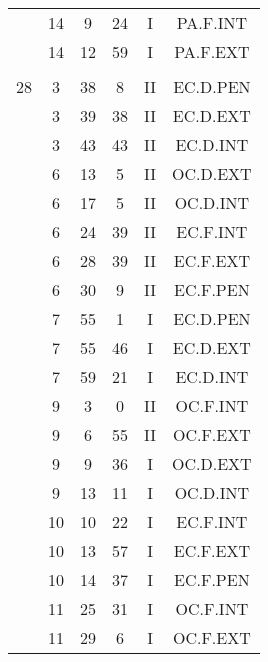 \documentclass[12pt, a4paper]{article}
\begin{document}
\begin{multicols}{3}
{\begin{tabular}{c c c c c c}
	 	 	 	 & 14 & 9 & 24 & I & PA.F.INT\\%
	 	 	 	 & 14 & 12 & 59 & I & PA.F.EXT\\%
	 	 	 	 & & & & & \\%
	 	 	 	28 & 3 & 38 & 8 & II & EC.D.PEN\\%
	 	 	 	 & 3 & 39 & 38 & II & EC.D.EXT\\%
	 	 	 	 & 3 & 43 & 43 & II & EC.D.INT\\%
	 	 	 	 & 6 & 13 & 5 & II & OC.D.EXT\\%
	 	 	 	 & 6 & 17 & 5 & II & OC.D.INT\\%
	 	 	 	 & 6 & 24 & 39 & II & EC.F.INT\\%
	 	 	 	 & 6 & 28 & 39 & II & EC.F.EXT\\%
	 	 	 	 & 6 & 30 & 9 & II & EC.F.PEN\\%
	 	 	 	 & 7 & 55 & 1 & I & EC.D.PEN\\%
	 	 	 	 & 7 & 55 & 46 & I & EC.D.EXT\\%
	 	 	 	 & 7 & 59 & 21 & I & EC.D.INT\\%
	 	 	 	 & 9 & 3 & 0 & II & OC.F.INT\\%
	 	 	 	 & 9 & 6 & 55 & II & OC.F.EXT\\%
	 	 	 	 & 9 & 9 & 36 & I & OC.D.EXT\\%
	 	 	 	 & 9 & 13 & 11 & I & OC.D.INT\\%
	 	 	 	 & 10 & 10 & 22 & I & EC.F.INT\\%
	 	 	 	 & 10 & 13 & 57 & I & EC.F.EXT\\%
	 	 	 	 & 10 & 14 & 37 & I & EC.F.PEN\\%
	 	 	 	 & 11 & 25 & 31 & I & OC.F.INT\\%
	 	 	 	 & 11 & 29 & 6 & I & OC.F.EXT\\%

\end{tabular}}
\end{multicols}
\end{document}
